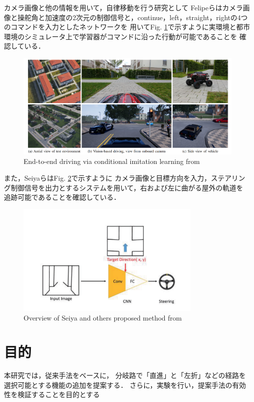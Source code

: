 \newpage
カメラ画像と他の情報を用いて，自律移動を行う研究として
Felipeら\cite{razikon}はカメラ画像と操舵角と加速度の2次元の制御信号と，continue，left，straight，rightの4つのコマンドを入力としたネットワークを
用いてFig. \ref{fig::Conditional_Imitation_Learning}で示すように実環境と都市環境のシミュレータ上で学習器がコマンドに沿った行動が可能であることを
確認している．
\begin{figure}[H]
    \centering
    \includegraphics[width = 12cm]{./figs/End-to-end_Driving_via_Conditional_Imitation_Learning.pdf}
    \caption{End-to-end  driving  via  conditional  imitation  learning from \cite{razikon}}
    \label{fig::Conditional_Imitation_Learning}
\end{figure}

また，Seiyaら\cite{nagoya}はFig. \ref{fig::nagoyaabst}で示すように
カメラ画像と目標方向を入力，ステアリング制御信号を出力とするシステムを用いて，右および左に曲がる屋外の軌道を
追跡可能であることを確認している．

\begin{figure}[H]
    \centering
    \includegraphics[width = 9cm]{./figs/End-to-End_Navigation_with_Branch_Turning_Support_using_Convolutional_Neural_Network_abst.pdf}
    \caption{Overview of Seiya and others proposed method from \cite{nagoya}}
    \label{fig::nagoyaabst}
\end{figure}


\section{目的}
本研究では，従来手法をベースに，
分岐路で「直進」と「左折」などの経路を選択可能とする機能の追加を提案する．
さらに，実験を行い，提案手法の有効性を検証することを目的とする

